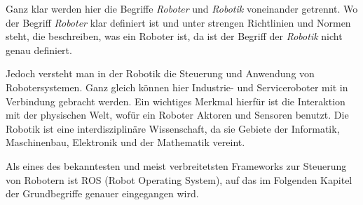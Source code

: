 \begin{flushleft}
    Ganz klar werden hier die Begriffe \textit{Roboter} und \textit{Robotik} voneinander getrennt.
    Wo der Begriff \textit{Roboter} klar definiert ist und unter strengen Richtlinien und Normen steht, die beschreiben, was ein Roboter ist, da ist der Begriff der \textit{Robotik} nicht genau definiert.
    
    Jedoch versteht man in der Robotik die Steuerung und Anwendung von Robotersystemen.
    Ganz gleich können hier Industrie- und Serviceroboter mit in Verbindung gebracht werden.
    Ein wichtiges Merkmal hierfür ist die Interaktion mit der physischen Welt, wofür ein Roboter Aktoren und Sensoren benutzt.
    Die Robotik ist eine interdisziplinäre Wissenschaft, da sie Gebiete der Informatik, Maschinenbau, Elektronik und der Mathematik vereint. 
    \cite{robotik_konradin}

    Als eines des bekanntesten und meist verbreitetsten Frameworks zur Steuerung von Robotern ist ROS (Robot Operating System), auf das im Folgenden Kapitel der Grundbegriffe genauer eingegangen wird.

\end{flushleft}